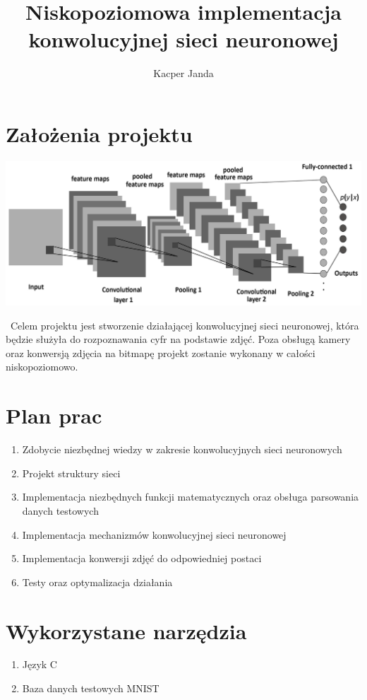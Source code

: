 \documentclass[11pt, a4paper]{article}
\begin{document}
\title{Niskopoziomowa implementacja konwolucyjnej sieci neuronowej}
\author{Kacper Janda}
\date{}
\maketitle

\section{Założenia projektu}
\begin{center}
\includegraphics[scale=0.6]{CNN.png}
\end{center}\
Celem projektu jest stworzenie działającej konwolucyjnej sieci neuronowej, która będzie służyła do rozpoznawania cyfr na podstawie zdjęć. Poza obsługą kamery oraz konwersją zdjęcia na bitmapę projekt zostanie wykonany w całości niskopoziomowo.
\section{Plan prac}
\begin{enumerate}
\item Zdobycie niezbędnej wiedzy w zakresie konwolucyjnych sieci neuronowych
\item Projekt struktury sieci
\item Implementacja niezbędnych funkcji matematycznych oraz obsługa parsowania danych testowych
\item Implementacja mechanizmów konwolucyjnej sieci neuronowej
\item Implementacja konwersji zdjęć do odpowiedniej postaci
\item Testy oraz optymalizacja działania
\end{enumerate}
\section{Wykorzystane narzędzia}
\begin{enumerate}
\item Język C
\item Baza danych testowych MNIST
\end{enumerate}
\end{document}
